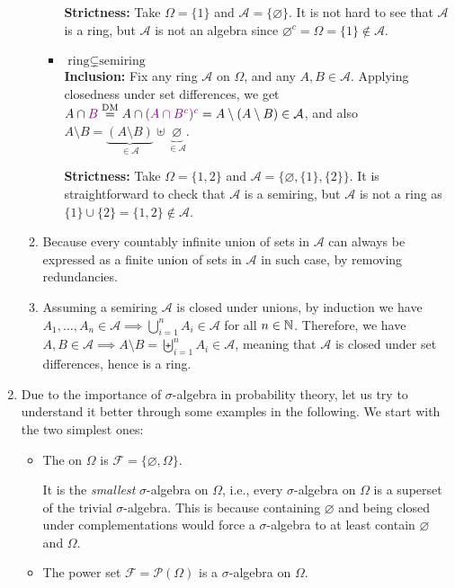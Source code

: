 \begin{enumerate}
\begin{pf}
\begin{enumerate}
\begin{itemize}
\textbf{Strictness:} Take \(\Omega=\{1\}\) and \(\mathcal{A}=\{\varnothing\}\).
It is not hard to see that \(\mathcal{A}\) is a ring, but \(\mathcal{A}\) is
not an algebra since \(\varnothing^c=\Omega=\{1\}\notin \mathcal{A}\).

\item \underline{\(\text{ring}\subsetneq\text{semiring}\)} \\
\textbf{Inclusion:} Fix any ring \(\mathcal{A}\) on \(\Omega\), and any \(A,B\in\mathcal{A}\).
Applying closedness under set differences, we get
\(A\cap {\color{violet}B}\overset{\text{DM}}{=}A\cap{\color{violet}(A\cap B^c)^c}
=A\setminus (A\setminus B)\in \mathcal{A}\), and also
\(A\setminus B=\underbrace{(A\setminus B)}_{\in\mathcal{A}}\uplus\underbrace{\varnothing}_{\in \mathcal{A}}\).

\textbf{Strictness:} Take \(\Omega=\{1,2\}\) and \(\mathcal{A}=\{\varnothing,\{1\},\{2\}\}\).
It is straightforward to check that \(\mathcal{A}\) is a semiring, but
\(\mathcal{A}\) is not a ring as \(\{1\}\cup\{2\}=\{1,2\}\notin\mathcal{A}\).
\end{itemize}
\item Because every countably infinite union of sets in \(\mathcal{A}\) can
always be expressed as a finite union of sets in \(\mathcal{A}\) in such case,
by removing redundancies.
\item Assuming a semiring \(\mathcal{A}\) is closed under unions, by
induction we have \(A_1,\dotsc,A_n\in\mathcal{A}\implies
\bigcup_{i=1}^{n}A_i\in\mathcal{A}\) for all \(n\in\mathbb{N}\). Therefore, we have
\(A,B\in\mathcal{A}\implies A\setminus B=\biguplus_{i=1}^{n}A_i\in\mathcal{A}\),
meaning that \(\mathcal{A}\) is closed under set differences, hence is a ring.
\end{enumerate}
\end{pf}
\item Due to the importance of \(\sigma\)-algebra in probability theory, let us
try to understand it better through some examples in the following.
We start with the two simplest ones:
\begin{itemize}
\item The  on \(\Omega\) is
\(\mathcal{F}=\{\varnothing,\Omega\}\).
\begin{note}
It is the \emph{smallest} \(\sigma\)-algebra on \(\Omega\), i.e., every
\(\sigma\)-algebra on \(\Omega\) is a superset of the trivial
\(\sigma\)-algebra.  This is because containing \(\varnothing\) and being
closed under complementations would force a \(\sigma\)-algebra to at least
contain \(\varnothing\) and \(\Omega\).
\end{note}
\item The power set \(\mathcal{F}=\mathcal{P}(\Omega)\) is a \(\sigma\)-algebra
on \(\Omega\).


\end{itemize}
\end{enumerate}
